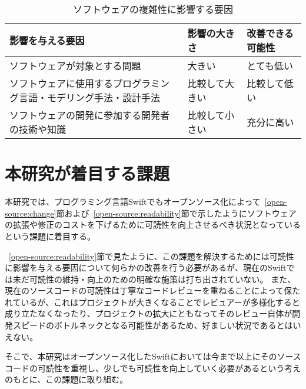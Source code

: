 \begin{table}[!hbtp]
    \begin{center}
        \caption{ソフトウェアの複雑性に影響する要因}
        \begin{tabular}{|p{0.6\linewidth}|p{0.2\linewidth}|p{0.2\linewidth}|}
            \hline
            影響を与える要因 & 影響の大きさ & 改善できる可能性 \\
            \hline
            \hline
            ソフトウェアが対象とする問題 & 大きい & とても低い \\
            \hline
            ソフトウェアに使用するプログラミング言語・モデリング手法・設計手法 & 比較して大きい & 比較して低い \\
            \hline
            ソフトウェアの開発に参加する開発者の技術や知識 & 比較して小さい & 充分に高い \\
            \hline
        \end{tabular}
        \label{table:complexity-elements}
    \end{center}
\end{table}

\section{本研究が着目する課題}
\label{open-source:issue}

本研究では、プログラミング言語Swiftでもオープンソース化によって~\ref{open-source:change}節および~\ref{open-source:readability}節で示したようにソフトウェアの拡張や修正のコストを下げるために可読性を向上させるべき状況となっているという課題に着目する。

~\ref{open-source:readability}節で見たように、この課題を解決するためには可読性に影響を与える要因について何らかの改善を行う必要があるが、現在のSwiftでは未だ可読性の維持・向上のための明確な施策は打ち出されていない。
また、現在のソースコードの可読性は丁寧なコードレビューを重ねることによって保たれているが、これはプロジェクトが大きくなることでレビュアーが多様化すると成り立たなくなったり、プロジェクトの拡大にともなってそのレビュー自体が開発スピードのボトルネックとなる可能性があるため、好ましい状況であるとはいえない。

そこで、本研究はオープンソース化したSwiftにおいては今まで以上にそのソースコードの可読性を重視し、少しでも可読性を向上していく必要があるという考えのもとに、この課題に取り組む。

